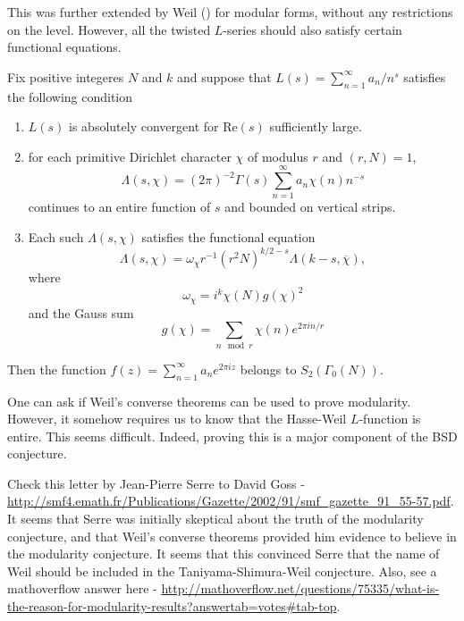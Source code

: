 \documentclass{book}
\begin{document}
This was further extended by Weil (\cite{weil1967bestimmung}) for modular forms, without any restrictions on the level. However, all the twisted $L$-series should also satisfy certain functional equations.

\begin{theorem} [Weil]
Fix positive integeres $N$ and $k$ and suppose that $L(s) = \sum_{n=1}^{\infty}a_n/n^s$ satisfies the following condition
\begin{enumerate}
\item $L(s)$ is absolutely convergent for $\text{Re}(s)$ sufficiently large.
\item for each primitive Dirichlet character $\chi$ of modulus $r$ and $(r,N)=1$,
\begin{equation}
\Lambda(s,\chi) = (2 \pi)^{-2} \Gamma(s)  \sum_{n=1}^{\infty} a_n \chi(n) n^{-s}
\end{equation}
continues to an entire function of $s$ and bounded on vertical strips.
\item Each such $\Lambda(s,\chi)$ satisfies the functional equation
\begin{equation}
\Lambda(s,\chi)= \omega_\chi r^{-1} (r^2 N)^{k/2-s} \Lambda(k-s,\overline{\chi}),
\end{equation}
where
\begin{equation}
\omega_\chi = i^k \chi(N) g(\chi)^2
\end{equation}
and the Gauss sum
\begin{equation}
g(\chi)=\sum_{n \mod r} \chi(n) e^{2 \pi i n /r}
\end{equation}
\end{enumerate}
Then the function $f(z) = \sum_{n=1}^{\infty} a_n e^{2 \pi i z }$ belongs to $S_2(\Gamma_0(N))$.
\end{theorem}

One can ask if Weil's converse theorems can be used to prove modularity. However, it somehow requires us to know that the Hasse-Weil $L$-function is entire. This seems difficult. Indeed, proving this is a major component of the BSD conjecture.

Check this letter by Jean-Pierre Serre to David Goss - \url{http://smf4.emath.fr/Publications/Gazette/2002/91/smf_gazette_91_55-57.pdf}. It seems that Serre was initially skeptical about the truth of the modularity conjecture, and that Weil's converse theorems provided him evidence to believe in the modularity conjecture. It seems that this convinced Serre that the name of Weil should be included in the Taniyama-Shimura-Weil conjecture. Also, see a mathoverflow answer here - \url{http://mathoverflow.net/questions/75335/what-is-the-reason-for-modularity-results?answertab=votes#tab-top}.
\end{document}
